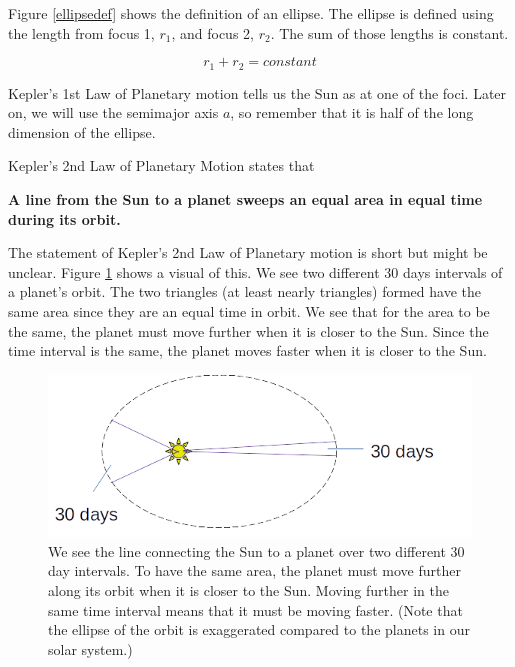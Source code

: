 \documentclass[12pt]{book}
\begin{document}
Figure \ref{ellipsedef} shows the definition of an ellipse. The ellipse is defined using the length from focus 1, $r_1$, and focus 2, $r_2$. The sum of those lengths is constant.

\begin{equation}
r_1 + r_2 = constant
\end{equation}

Kepler's 1st Law of Planetary motion tells us the Sun as at one of the foci. Later on, we will use the semimajor axis $a$, so remember that it is half of the long dimension of the ellipse.

\linespace

Kepler's 2nd Law of Planetary Motion states that

\textbf{A line from the Sun to a planet sweeps an equal area in equal time during its orbit.}

\linespace

The statement of Kepler's 2nd Law of Planetary motion is short but might be unclear. Figure \ref{Keplers2nd} shows a visual of this. We see two different 30 days intervals of a planet's orbit. The two triangles (at least nearly triangles) formed have the same area since they are an equal time in orbit. We see that for the area to be the same, the planet must move further when it is closer to the Sun. Since the time interval is the same, the planet moves faster when it is closer to the Sun.

\begin{figure}[H]
\centering
\includegraphics[scale=0.6]{Keplers2nd.png}
\caption{We see the line connecting the Sun to a planet over two different 30 day intervals. To have the same area, the planet must move further along its orbit when it is closer to the Sun. Moving further in the same time interval means that it must be moving faster. (Note that the ellipse of the orbit is exaggerated compared to the planets in our solar system.)}
\label{Keplers2nd}
\end{figure}

\linespace 
\end{document}
